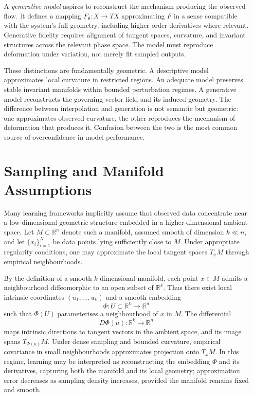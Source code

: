 \documentclass[12pt]{book}
\begin{document}
A \emph{generative model} aspires to reconstruct the mechanism producing the
observed flow. It defines a mapping $\tilde{F}_\theta : X \to TX$ approximating
$F$ in a sense compatible with the system's full geometry, including
higher-order derivatives where relevant. Generative fidelity requires alignment
of tangent spaces, curvature, and invariant structures across the relevant
phase space. The model must reproduce deformation under variation, not merely
fit sampled outputs.

These distinctions are fundamentally geometric. A descriptive model
approximates local curvature in restricted regions. An adequate model preserves
stable invariant manifolds within bounded perturbation regimes. A generative
model reconstructs the governing vector field and its induced geometry. The
difference between interpolation and generation is not semantic but geometric:
one approximates observed curvature, the other reproduces the mechanism of
deformation that produces it. Confusion between the two is the most common
source of overconfidence in model performance.

\section{Sampling and Manifold Assumptions}

Many learning frameworks implicitly assume that observed data concentrate near
a low-dimensional geometric structure embedded in a higher-dimensional ambient
space. Let $M \subset \mathbb{R}^n$ denote such a manifold, assumed smooth of
dimension $k \ll n$, and let $\{x_i\}_{i=1}^N$ be data points lying
sufficiently close to $M$. Under appropriate regularity conditions, one may
approximate the local tangent spaces $T_x M$ through empirical neighbourhoods.

By the definition of a smooth $k$-dimensional manifold, each point $x \in M$
admits a neighbourhood diffeomorphic to an open subset of $\mathbb{R}^k$. Thus
there exist local intrinsic coordinates $(u_1,\dots,u_k)$ and a smooth
embedding
\[
  \Phi : U \subset \mathbb{R}^k \to \mathbb{R}^n
\]
such that $\Phi(U)$ parameterises a neighbourhood of $x$ in $M$. The
differential
\[
  D\Phi(u) : \mathbb{R}^k \to \mathbb{R}^n
\]
maps intrinsic directions to tangent vectors in the ambient space, and its
image spans $T_{\Phi(u)} M$. Under dense sampling and bounded curvature,
empirical covariance in small neighbourhoods approximates projection onto
$T_x M$. In this regime, learning may be interpreted as reconstructing the
embedding $\Phi$ and its derivatives, capturing both the manifold and its
local geometry; approximation error decreases as sampling density increases,
provided the manifold remains fixed and smooth.
\end{document}
